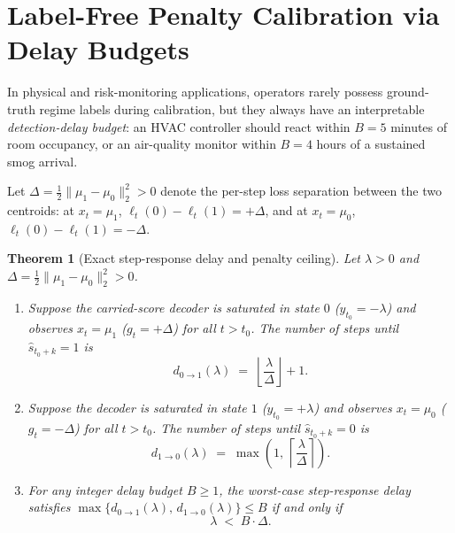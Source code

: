\documentclass[11pt]{article}
\newtheorem{theorem}{Theorem}
\begin{document}
\section{Label-Free Penalty Calibration via Delay Budgets}
\label{sec:calibration}

In physical and risk-monitoring applications, operators rarely possess ground-truth regime labels during calibration, but they always have an interpretable \emph{detection-delay budget}: an HVAC controller should react within $B = 5$ minutes of room occupancy, or an air-quality monitor within $B = 4$ hours of a sustained smog arrival.

Let $\Delta = \frac{1}{2}\|\mu_1 - \mu_0\|_2^2 > 0$ denote the per-step loss separation between the two centroids: at $x_t = \mu_1$, $\ell_t(0) - \ell_t(1) = +\Delta$, and at $x_t = \mu_0$, $\ell_t(0) - \ell_t(1) = -\Delta$.

\begin{theorem}[Exact step-response delay and penalty ceiling]
\label{thm:delay}
Let $\lambda > 0$ and $\Delta = \frac{1}{2}\|\mu_1 - \mu_0\|_2^2 > 0$.
\begin{enumerate}
  \item Suppose the carried-score decoder is saturated in state $0$ ($y_{t_0} = -\lambda$) and observes $x_t = \mu_1$ ($g_t = +\Delta$) for all $t > t_0$. The number of steps until $\hat{s}_{t_0+k} = 1$ is
  \begin{equation}
    d_{0\to 1}(\lambda) \;=\; \left\lfloor \frac{\lambda}{\Delta} \right\rfloor + 1.
    \label{eq:d01}
  \end{equation}
  \item Suppose the decoder is saturated in state $1$ ($y_{t_0} = +\lambda$) and observes $x_t = \mu_0$ ($g_t = -\Delta$) for all $t > t_0$. The number of steps until $\hat{s}_{t_0+k} = 0$ is
  \begin{equation}
    d_{1\to 0}(\lambda) \;=\; \max\!\left(1,\, \left\lceil \frac{\lambda}{\Delta} \right\rceil\right).
    \label{eq:d10}
  \end{equation}
  \item For any integer delay budget $B \ge 1$, the worst-case step-response delay satisfies $\max\{d_{0\to 1}(\lambda),\allowbreak\, d_{1\to 0}(\lambda)\} \le B$ if and only if
  \begin{equation}
    \lambda \;<\; B \cdot \Delta.
    \label{eq:budget}
  \end{equation}
\end{enumerate}
\end{theorem}
\end{document}
